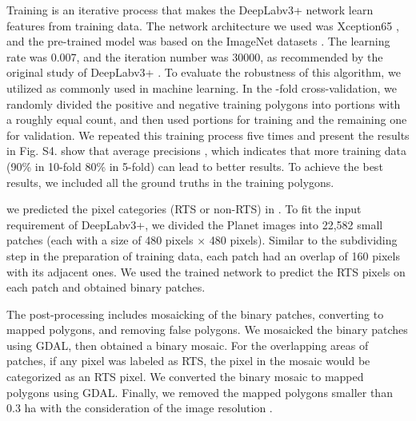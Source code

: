 \documentclass[authoryear,preprint,review,12pt]{elsarticle}
\begin{document}
Training is an iterative process that makes the DeepLabv3+ network learn features from training data. The network architecture we used was Xception65 \citep{chollet2017xception}, and the pre-trained model was based on the ImageNet datasets \citep{russakovsky2015imagenet}. The learning rate was 0.007, and the iteration number was 30000, as recommended by the original study of DeepLabv3+ \citep{chen_encoder-decoder_2018}.  To evaluate the robustness of this algorithm, we utilized  as commonly used in machine learning. In the -fold cross-validation, we randomly divided the positive and negative training polygons into  portions with a roughly equal count, and then used  portions for training and the remaining one for validation. We repeated this training process five times and present the results in Fig. S4.  show that average precisions  , which indicates that more training data (90\% in 10-fold 80\% in 5-fold) can lead to better results. To achieve the best results, we included all the ground truths in the training polygons. 

 we  predicted the pixel categories (RTS or non-RTS) in . To fit the input requirement of DeepLabv3+, we divided the Planet images into 22,582 small patches (each with a size of 480 pixels $\times$ 480 pixels). Similar to the subdividing step in the preparation of training data, each patch had an overlap of 160 pixels with its adjacent ones. We used the trained network to predict the RTS pixels on each patch and obtained binary patches. 

The post-processing includes mosaicking of the binary patches, converting to mapped polygons, and removing false polygons. We mosaicked the binary patches using GDAL, then obtained a binary mosaic. For the overlapping areas of patches, if any pixel was labeled as RTS, the pixel in the mosaic would be categorized as an RTS pixel. We converted the binary mosaic to mapped polygons using GDAL. Finally, we removed the mapped polygons  smaller than 0.3 ha with the consideration of the image resolution .  
\end{document}
